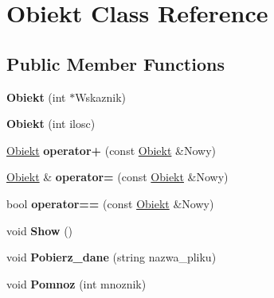 \hypertarget{class_obiekt}{\section{\-Obiekt \-Class \-Reference}
\label{class_obiekt}
}
\subsection*{\-Public \-Member \-Functions}
\begin{DoxyCompactItemize}
\item 
\hypertarget{class_obiekt_a8e2e3537c41235fe165117c3a09b9669}{{\bfseries \-Obiekt} (int $\ast$\-Wskaznik)}\label{class_obiekt_a8e2e3537c41235fe165117c3a09b9669}

\item 
\hypertarget{class_obiekt_afabb4c028448dd71ee48fb1ddbff695b}{{\bfseries \-Obiekt} (int ilosc)}\label{class_obiekt_afabb4c028448dd71ee48fb1ddbff695b}

\item 
\hypertarget{class_obiekt_ae9b27f251c823ca866ae63479a901a7a}{\hyperlink{class_obiekt}{\-Obiekt} {\bfseries operator+} (const \hyperlink{class_obiekt}{\-Obiekt} \&\-Nowy)}\label{class_obiekt_ae9b27f251c823ca866ae63479a901a7a}

\item 
\hypertarget{class_obiekt_a75a7336fe08d7ba99ad507371470c33f}{\hyperlink{class_obiekt}{\-Obiekt} \& {\bfseries operator=} (const \hyperlink{class_obiekt}{\-Obiekt} \&\-Nowy)}\label{class_obiekt_a75a7336fe08d7ba99ad507371470c33f}

\item 
\hypertarget{class_obiekt_a1dd7d24ba8cce83355da18a75c89deca}{bool {\bfseries operator==} (const \hyperlink{class_obiekt}{\-Obiekt} \&\-Nowy)}\label{class_obiekt_a1dd7d24ba8cce83355da18a75c89deca}

\item 
\hypertarget{class_obiekt_a59b1b7dcf398424366b132d5ae7ac087}{void {\bfseries \-Show} ()}\label{class_obiekt_a59b1b7dcf398424366b132d5ae7ac087}

\item 
\hypertarget{class_obiekt_a481091a905fc01050b9bf782502efabb}{void {\bfseries \-Pobierz\-\_\-dane} (string nazwa\-\_\-pliku)}\label{class_obiekt_a481091a905fc01050b9bf782502efabb}

\item 
\hypertarget{class_obiekt_aae43ab1926c5c6ccd82d0908c33474da}{void {\bfseries \-Pomnoz} (int mnoznik)}\label{class_obiekt_aae43ab1926c5c6ccd82d0908c33474da}


\end{DoxyCompactItemize}
